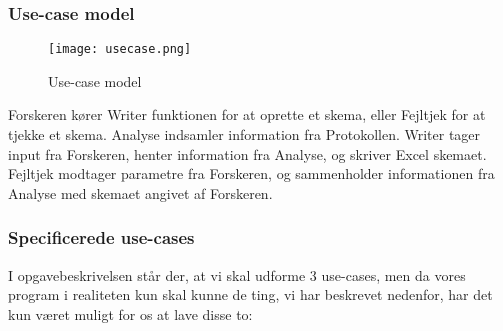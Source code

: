\documentclass[11pt]{article}
\begin{document}
\subsubsection{Use-case model}
\begin{figure}[H]
\texttt{[image: usecase.png]}
\caption{Use-case model}
\end{figure}
Forskeren kører Writer funktionen for at oprette et skema,
eller Fejltjek for at tjekke et skema.
Analyse indsamler information fra Protokollen.
Writer tager input fra Forskeren, henter information fra Analyse, og skriver Excel skemaet.
Fejltjek modtager parametre fra Forskeren, og sammenholder informationen fra Analyse med
skemaet angivet af Forskeren.
\subsubsection{Specificerede use-cases}
I opgavebeskrivelsen står der, at vi skal udforme 3 use-cases, men da vores program i realiteten kun skal kunne de ting, vi har beskrevet nedenfor, har det kun været muligt for os at lave disse to:\\
\end{document}
